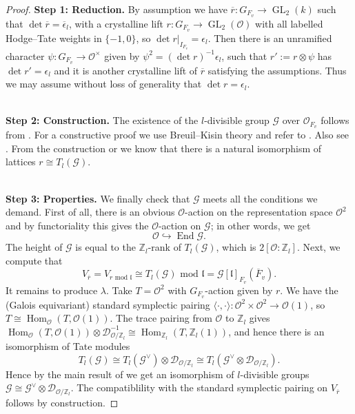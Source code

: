 \documentclass[10pt]{article}
\theoremstyle{definition}
\numberwithin{equation}{theorem}
\newcommand{\ZZ}{\mathbb{Z}}
\newcommand{\calD}{\mathcal{D}}
\newcommand{\calG}{\mathcal{G}}
\newcommand{\calO}{\mathcal{O}}
\newcommand{\gothl}{\mathfrak{l}}
\DeclareMathOperator{\End}{End}
\DeclareMathOperator{\GL}{GL}
\DeclareMathOperator{\Hom}{Hom}
\begin{document}
\begin{proof}

\textbf{Step 1: Reduction.} By assumption we have $\overline{r}:G_{F_v}\to\GL_2(k)$ such that  $\det\overline{r}=\overline{\epsilon}_l$, with a crystalline lift $r:G_{F_v}\to\GL_2(\calO)$ with all labelled Hodge--Tate weights in $\{-1,0\}$, so $\det r|_{I_{F_v}}=\epsilon_l$. Then there is an unramified character $\psi:G_{F_v}\to\calO^\times$ given by $\psi^2=(\det r)^{-1}\epsilon_l$, such that $r':=r\otimes\psi$ has $\det r'=\epsilon_l$ and it is another crystalline lift of $\overline{r}$ satisfying the assumptions. Thus we may assume without loss of generality that $\det r=\epsilon_l$.

\hspace*{\fill} \\
\textbf{Step 2: Construction.} The existence of the $l$-divisible group $\calG$ over $\calO_{F_v}$ follows from \cite[Corollary~6.2.3]{SW13}. For a constructive proof we use Breuil--Kisin theory and refer to \cite[Lemma~2.1.15 and Corollary~2.2.6]{Kis06}. Also see \cite[Lemma~11.2.10 and Theorem~12.3.2]{BC09}. From the construction \cite[Corollary~2.2.6]{Kis06} or \cite[Theorem~12.3.2]{BC09} we know that there is a natural isomorphism of lattices $r\cong T_l(\calG)$.

\hspace*{\fill} \\
\textbf{Step 3: Properties.} We finally check that $\calG$ meets all the conditions we demand. First of all, there is an obvious $\calO$-action on the representation space $\calO^2$ and by functoriality this gives the $\calO$-action on $\calG$; in other words, we get $$\calO\hookrightarrow\End\calG.$$ The height of $\calG$ is equal to the $\ZZ_l$-rank of $T_l(\calG)$, which is $2[\calO:\ZZ_l]$. 
Next, we compute that $$V_{\overline{r}}=V_{r\text{ mod }\gothl}\cong T_l(\calG)\text{ mod }\gothl=\calG[\gothl]_{F_v}(\overline{F}_v).$$
It remains to produce $\lambda$. Take $T=\calO^2$ with $G_{F_v}$-action given by $r$. We have the (Galois equivariant) standard symplectic pairing $\langle\cdot,\cdot\rangle:\calO^2\times\calO^2\to\calO(1)$, so $T\cong\Hom_\calO(T,\calO(1))$. The trace pairing from $\calO$ to $\ZZ_l$ gives $\Hom_\calO(T,\calO(1))\otimes\calD^{-1}_{\calO/\ZZ_l}\cong\Hom_{\ZZ_l}(T,\ZZ_l(1))$, and hence there is an isomorphism of Tate modules $$T_l(\calG)\cong T_l(\calG^\vee)\otimes\calD_{\calO/\ZZ_l}\cong T_l(\calG^\vee\otimes\calD_{\calO/\ZZ_l}).$$ 
Hence by the main result of \cite{Tat67} we get an isomorphism of $l$-divisible groups $\calG\cong\calG^\vee\otimes\calD_{\calO/\ZZ_l}$. The compatiblility with the standard symplectic pairing on $V_{\overline{r}}$ follows by construction.


\end{proof}
\end{document}
